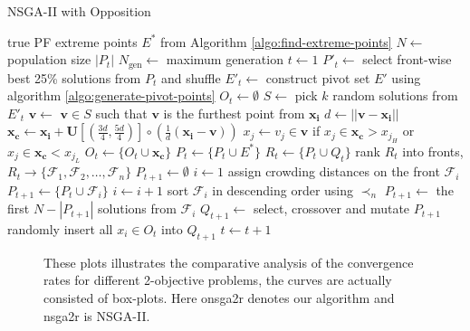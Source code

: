 \documentclass{sig-alternate-05-2015}
\begin{document}
\begin{algorithm}[tp]
\caption{NSGA-II with Opposition}
\label{algo:onsga2}
{\footnotesize
\begin{algorithmic}[1]
	\REQUIRE true PF extreme points $E^{\ast}$ from Algorithm \ref{algo:find-extreme-points}
	\STATE $N \leftarrow$ population size $|P_t|$
	\STATE $N_{\text{gen}} \leftarrow $ maximum generation
	\STATE $t \leftarrow 1$
		\STATE $P'_t \leftarrow$ select front-wise best 25\% solutions from $P_t$ and shuffle
		\STATE $E'_t \leftarrow$ construct pivot set $E'$ using algorithm \ref{algo:generate-pivot-points}
		\STATE $O_t \leftarrow \emptyset$
			\STATE $S \leftarrow$ pick $k$ random solutions from $E'_t$
			\STATE $\mathbf{v} \leftarrow$ $\mathbf{v} \in S$ such that $\mathbf{v}$ is the furthest point from $\mathbf{x_i}$
			\STATE $d \leftarrow ||\mathbf{v} - \mathbf{x_i}||$
			\STATE $\mathbf{x_c} \leftarrow \mathbf{x_i} + \mathbf{U}[(\frac{3d}{4}, \frac{5d}{4})] \circ (\frac{1}{d}(\mathbf{x_i} - \mathbf{v}))$
			\STATE $x_j \leftarrow v_j \in \mathbf{v}$ if $x_j \in \mathbf{x_c} > x_{j_H}$ or $x_j \in \mathbf{x_c} < x_{j_L}$ 
			\STATE $O_t \leftarrow \{O_t \cup \mathbf{x_c}\}$
		\ENDFOR
		\STATE $P_t \leftarrow \{P_t \cup  E^\ast\}$
		\STATE $R_t \leftarrow \{P_t \cup Q_t\}$
		\STATE rank $R_t$ into fronts, $R_t \rightarrow \{\mathcal{F}_1, \mathcal{F}_2, \ldots, \mathcal{F}_n\}$
		\STATE $P_{t+1} \leftarrow \emptyset$
		\STATE $i \leftarrow 1$
			\STATE assign crowding distances on the front $\mathcal{F}_i$
			\STATE $P_{t+1} \leftarrow \{P_t \cup \mathcal{F}_i\}$
			\STATE $i \leftarrow i + 1$
		\ENDWHILE
		\STATE sort $\mathcal{F}_i$ in descending order using $\prec_n$
		\STATE $P_{t+1} \leftarrow$ the first $N - |P_{t+1}|$ solutions from $\mathcal{F}_i$
		\STATE $Q_{t+1} \leftarrow$ select, crossover and mutate $P_{t+1}$
		\STATE randomly insert all $x_i \in O_t$ into $Q_{t+1}$
		\STATE $t \leftarrow t + 1$
	\ENDWHILE
\end{algorithmic}}
\end{algorithm}
%
%
\begin{figure*}[bp!]
	\centering
	\hfill
	\caption{These plots illustrates the comparative analysis of the convergence rates for different 2-objective problems, the curves are actually consisted of box-plots. Here onsga2r denotes our algorithm and nsga2r is NSGA-II.}
	\label{plot:onsga2r-hv-zdt}
\end{figure*}
%
\end{document}
